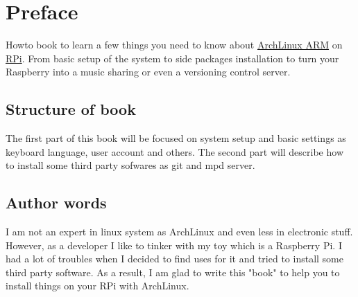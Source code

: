 \chapter*{Preface}
Howto book to learn a few things you need to know about 
\href{http://archlinuxarm.org/platforms/armv6/raspberry-pi}{ArchLinux ARM} 
on \href{http://www.raspberrypi.org/help/what-is-a-raspberry-pi/}{RPi}. 
From basic setup of the system to side packages installation to turn 
your Raspberry into a music sharing or even a versioning control server.

\section*{Structure of book}
The first part of this book will be focused on system setup and 
basic settings as keyboard language, user account and others. 
The second part will describe how to install some third party sofwares 
as git and mpd server.

\section*{Author words}
I am not an expert in linux system as ArchLinux and even less in electronic 
stuff. However, as a developer I like to tinker with my toy which is 
a Raspberry Pi. I had a lot of troubles when I decided to find uses for it 
and tried to install some third party software. As a result, I am glad to 
write this "book" to help you to install things on your RPi with ArchLinux.
